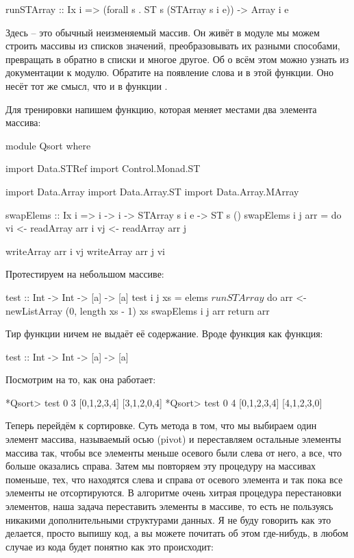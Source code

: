 \begin{code}
runSTArray :: Ix i => (forall s . ST s (STArray s i e)) -> Array i e
\end{code}

Здесь  -- это обычный неизменяемый массив. Он живёт в модуле
 мы можем строить массивы из списков значений,
преобразовывать их разными способами, превращать в обратно в списки и
многое другое. Об о всём этом можно узнать из документации к модулю.
Обратите на появление слова  и в этой функции. Оно несёт тот
же смысл, что и в функции .

Для тренировки напишем функцию, которая меняет местами два элемента
массива:


\begin{code}
module Qsort where

import Data.STRef
import Control.Monad.ST

import Data.Array
import Data.Array.ST
import Data.Array.MArray

swapElems :: Ix i => i -> i -> STArray s i e -> ST s ()
swapElems i j arr = do
     vi <- readArray arr i
     vj <- readArray arr j

     writeArray arr i vj
     writeArray arr j vi
\end{code}

Протестируем на небольшом массиве:


\begin{code}
test :: Int -> Int -> [a] -> [a]
test i j xs = elems $ runSTArray $ do
    arr <- newListArray (0, length xs - 1) xs
    swapElems i j arr
    return arr
\end{code}

Тир функции  ничем не выдаёт её содержание. Вроде функция как
функция:


\begin{code}
test :: Int -> Int -> [a] -> [a]
\end{code}

Посмотрим на то, как она работает:


\begin{code}
*Qsort> test 0 3 [0,1,2,3,4]
[3,1,2,0,4]
*Qsort> test 0 4 [0,1,2,3,4]
[4,1,2,3,0]
\end{code}

Теперь перейдём к сортировке. Суть метода в том, что мы выбираем один
элемент массива, называемый осью (pivot) и переставляем остальные
элементы массива так, чтобы все элементы меньше осевого были слева от
него, а все, что больше оказались справа. Затем мы повторяем эту
процедуру на массивах поменьше, тех, что находятся слева и справа от
осевого элемента и так пока все элементы не отсортируются. В алгоритме
очень хитрая процедура перестановки элементов, наша задача переставить
элементы в массиве, то есть не пользуясь никакими дополнительными
структурами данных. Я не буду говорить как это делается, просто выпишу
код, а вы можете почитать об этом где-нибудь, в любом случае из кода
будет понятно как это происходит:


